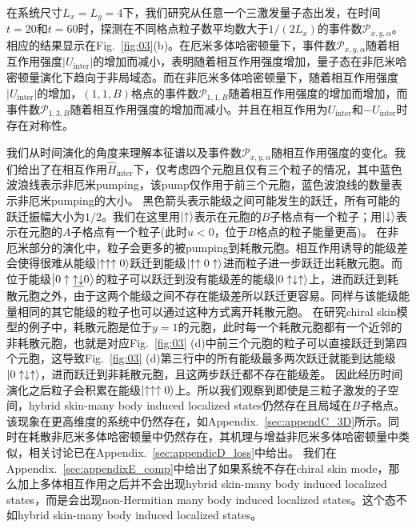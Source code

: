 \documentclass[longbibliography, aps, prx, amsmath, amssymb, amsfonts, twocolumn,superscriptaddress, footinbib]{revtex4-1}
\begin{document}
	在系统尺寸$L_x=L_y=4$下，我们研究从任意一个三激发量子态出发，在时间$t=20$和$t=60$时，探测在不同格点粒子数平均数大于$1/(2L_x)$的事件数$\mathcal{P}_{x,y,\alpha}$。相应的结果显示在Fig.~\ref{fig:03}(b)。在厄米多体哈密顿量下，事件数$\mathcal{P}_{x,y,\alpha}$随着相互作用强度$\vert U_{\text{inter}} \vert$的增加而减小，表明随着相互作用强度增加，量子态在非厄米哈密顿量演化下趋向于非局域态。而在非厄米多体哈密顿量下，随着相互作用强度$\vert U_{\text{inter}} \vert$的增加，$(1,1,B)$格点的事件数$\mathcal{P}_{1,1,B}$随着相互作用强度的增加而增加，而事件数$\mathcal{P}_{1,3,B}$随着相互作用强度的增加而减小。并且在相互作用为$U_{\text{inter}}$和$-U_{\text{inter}}$时存在对称性。


	我们从时间演化的角度来理解本征谱以及事件数$\mathcal{P}_{x,y,\alpha}$随相互作用强度的变化。我们给出了在相互作用$\hat{H}_{\text{inter}}$下，仅考虑四个元胞且仅有三个粒子的情况，其中蓝色波浪线表示非厄米pumping，该pump仅作用于前三个元胞，蓝色波浪线的数量表示非厄米pumping的大小。
	黑色箭头表示能级之间可能发生的跃迁，所有可能的跃迁振幅大小为$1/2$。我们在这里用$\ket{\uparrow}$表示在元胞的$B$子格点有一个粒子；用$\ket{\downarrow}$表示在元胞的$A$子格点有一个粒子(此时$u<0$，位于$B$格点的粒子能量更高)。
	在非厄米部分的演化中，粒子会更多的被pumping到耗散元胞。相互作用诱导的能级差会使得很难从能级$\ket{\uparrow\uparrow\uparrow0}$跃迁到能级$\ket{\uparrow\uparrow0\uparrow}$进而粒子进一步跃迁出耗散元胞。而位于能级$\ket{0\uparrow\underline{\uparrow\downarrow}0}$的粒子可以跃迁到没有能级差的能级$\ket{0\uparrow\downarrow\uparrow}$上，进而跃迁到耗散元胞之外，由于这两个能级之间不存在能级差所以跃迁更容易。同样与该能级能量相同的其它能级的粒子也可以通过这种方式离开耗散元胞。
	在研究chiral skin模型的例子中，耗散元胞是位于$y=1$的元胞，此时每一个耗散元胞都有一个近邻的非耗散元胞，也就是对应Fig.~\ref{fig:03} (d)中前三个元胞的粒子可以直接跃迁到第四个元胞，这导致Fig.~\ref{fig:03} (d)第三行中的所有能级最多两次跃迁就能到达能级$\ket{0\uparrow\downarrow\uparrow}$，进而跃迁到非耗散元胞，且这两步跃迁都不存在能级差。
	因此经历时间演化之后粒子会积累在能级$\ket{\uparrow\uparrow\uparrow0}$上。所以我们观察到即使是三粒子激发的子空间，hybrid skin-many body induced localized states仍然存在且局域在$B$子格点。
	该现象在更高维度的系统中仍然存在，如Appendix.~\ref{sec:appendC_3D}所示。同时在耗散非厄米多体哈密顿量中仍然存在，其机理与增益非厄米多体哈密顿量中类似，相关讨论已在Appendix.~\ref{sec:appendicD_loss}中给出。
	我们在Appendix.~\ref{sec:appendixE_comp}中给出了如果系统不存在chiral skin mode，那么加上多体相互作用之后并不会出现hybrid skin-many body induced localized states，而是会出现non-Hermitian many body induced localized states。这个态不如hybrid skin-many body induced localized states。
\end{document}
